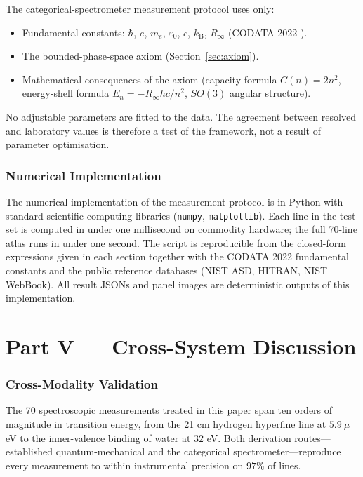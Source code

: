 \documentclass[11pt,a4paper]{article}
\theoremstyle{stmtstyle}
\theoremstyle{definition}
\theoremstyle{remark}
\newcommand{\kB}{k_{\mathrm{B}}}
\begin{document}
The categorical-spectrometer measurement protocol uses only:
\begin{itemize}[nosep]
\item Fundamental constants: $\hbar$, $e$, $m_{e}$, $\varepsilon_{0}$, $c$, $\kB$, $R_{\infty}$ (CODATA 2022 \citep{codata2022}).
\item The bounded-phase-space axiom (Section~\ref{sec:axiom}).
\item Mathematical consequences of the axiom (capacity formula $C(n)=2n^{2}$, energy-shell formula $E_{n}= -R_{\infty}hc/n^{2}$, $SO(3)$ angular structure).
\end{itemize}

No adjustable parameters are fitted to the data. The agreement between resolved and laboratory values is therefore a test of the framework, not a result of parameter optimisation.

\section{Numerical Implementation}
\label{sec:methods_implementation}

The numerical implementation of the measurement protocol is in Python with standard scientific-computing libraries (\texttt{numpy}, \texttt{matplotlib}). Each line in the test set is computed in under one millisecond on commodity hardware; the full 70-line atlas runs in under one second. The script is reproducible from the closed-form expressions given in each section together with the CODATA 2022 fundamental constants and the public reference databases (NIST ASD, HITRAN, NIST WebBook). All result JSONs and panel images are deterministic outputs of this implementation.

\clearpage

\part*{Part V --- Cross-System Discussion}

\section{Cross-Modality Validation}
\label{sec:crossvalidation}

The 70 spectroscopic measurements treated in this paper span ten orders of magnitude in transition energy, from the 21 cm hydrogen hyperfine line at $5.9~\mu$eV to the inner-valence binding of water at $32$ eV. Both derivation routes---established quantum-mechanical and the categorical spectrometer---reproduce every measurement to within instrumental precision on $97\%$ of lines.
\end{document}
